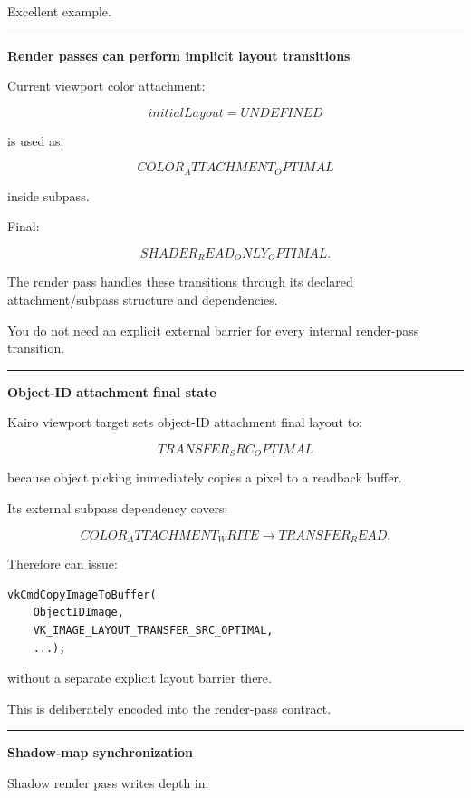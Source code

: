 Excellent example.

\begin{center}\rule{0.5\linewidth}{0.5pt}\end{center}

\textbf{Render passes can perform implicit layout transitions}

Current viewport color attachment:

\[
initialLayout=UNDEFINED
\]

is used as:

\[
COLOR_ATTACHMENT_OPTIMAL
\]

inside subpass.

Final:

\[
SHADER_READ_ONLY_OPTIMAL.
\]

The render pass handles these transitions through its declared attachment/subpass structure and dependencies.

You do not need an explicit external barrier for every internal render-pass transition.

\begin{center}\rule{0.5\linewidth}{0.5pt}\end{center}

\textbf{Object-ID attachment final state}

Kairo viewport target sets object-ID attachment final layout to:

\[
\boxed{
TRANSFER_SRC_OPTIMAL
}
\]

because object picking immediately copies a pixel to a readback buffer.

Its external subpass dependency covers:

\[
COLOR_ATTACHMENT_WRITE
\rightarrow
TRANSFER_READ.
\]

Therefore  can issue:

\begin{verbatim}
vkCmdCopyImageToBuffer(
    ObjectIDImage,
    VK_IMAGE_LAYOUT_TRANSFER_SRC_OPTIMAL,
    ...);
\end{verbatim}

without a separate explicit layout barrier there.

This is deliberately encoded into the render-pass contract.

\begin{center}\rule{0.5\linewidth}{0.5pt}\end{center}

\textbf{Shadow-map synchronization}

Shadow render pass writes depth in:

